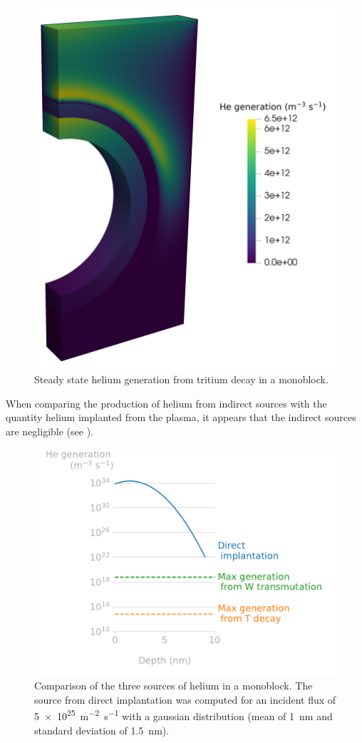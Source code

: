 \begin{figure}
    \centering
    \includegraphics[width=0.5\linewidth]{Figures/Chapter5/he_generation_decay.png}
    \caption{Steady state helium generation from tritium decay in a monoblock.}
\end{figure}


When comparing the production of helium from indirect sources with the quantity helium implanted from the plasma, it appears that the indirect sources are negligible (see ).

\begin{figure}
    \centering
    \includegraphics[width=\linewidth]{Figures/Chapter5/helium_generation.pdf}
    \caption{Comparison of the three sources of helium in a monoblock. The source from direct implantation was computed for an incident flux of \SI{5e25}{m^{-2}.s^{-1}} with a gaussian distribution (mean of \SI{1}{nm} and standard deviation of \SI{1.5}{nm}).}
\end{figure}